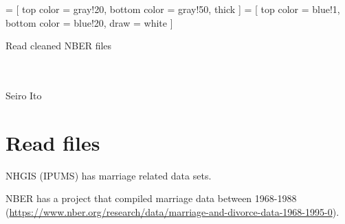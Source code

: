 

\renewcommand\Routcolor{\color{gray30}}
\makeatletter
\g@addto@macro{\UrlBreaks}{\UrlOrds}
\newcommand\gobblepars{%
    \@ifnextchar\par%
        {\expandafter\gobblepars\@gobble}%
        {}}
\makeatother
\def\pgfsysdriver{pgfsys-dvipdfm.def}
\usepackage{tikz}
\usetikzlibrary{calc, arrows, decorations, decorations.pathreplacing, backgrounds}
\usepackage{adjustbox}
\usepackage{longtable}
\usepackage{caption}
 =
[
top color = gray!20, bottom color = gray!50, thick
]
 =
[
top color = blue!1, bottom color = blue!20, draw = white
]



\setlength{\baselineskip}{12pt}





\hfil Read cleaned NBER files\\

\hfil\MonthDY\\
\hfil{\footnotesize\currenttime}\\
\renewcommand{\thefootnote}{*\arabic{footnote}}

\hfil Seiro Ito

\setcounter{tocdepth}{3}
\tableofcontents

\setlength{\parindent}{1em}
\vspace{2ex}


\section{Read files}


NHGIS (IPUMS) has marriage related data sets. 


NBER has a project that compiled marriage data between 1968-1988 {\footnotesize (\url{https://www.nber.org/research/data/marriage-and-divorce-data-1968-1995-0})}.



